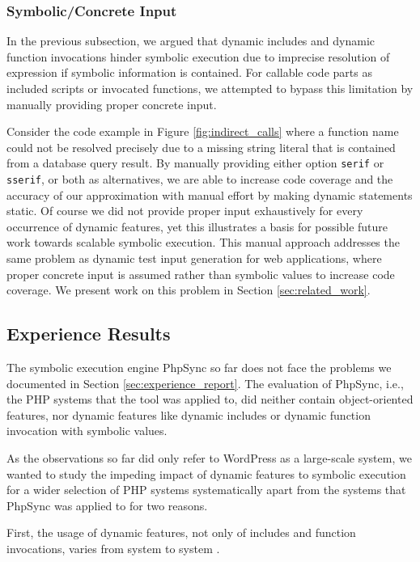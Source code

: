 \documentclass[sigconf]{acmart}
\renewcommand{\sf}[1]{\textsf{#1}}
\renewcommand{\tt}[1]{\texttt{#1}}
\begin{document}
\subsubsection{Symbolic/Concrete Input}
In the previous subsection, we argued that dynamic includes and dynamic
function invocations hinder symbolic execution  due to imprecise resolution of
expression if symbolic information is contained. For callable code parts as
included scripts or invocated functions, we attempted to bypass this limitation
by manually providing proper concrete input.

Consider the code example in Figure \ref{fig:indirect_calls} where a function
name could not be resolved precisely due to a missing string literal that is contained from a
database query result. By manually providing either option \tt{serif} or
\tt{sserif}, or both as alternatives, we are able to increase code coverage and
the accuracy of our approximation with manual effort by making dynamic
statements static. Of course we did not provide proper input exhaustively for
every occurrence of dynamic features, yet this illustrates a basis for possible
future work towards scalable symbolic execution. This manual approach addresses
the same problem as dynamic test input generation for web applications, where
proper concrete input is assumed rather than symbolic values to increase code
coverage. We present work on this problem in Section \ref{sec:related_work}.


\subsection{Experience Results} \label{sec:experience_results}
The symbolic execution engine \sf{PhpSync} \cite{Nguyen:2014:BCG:2635868.2635928} so far does not face the
problems we documented in Section \ref{sec:experience_report}. The evaluation of
PhpSync, i.e., the PHP systems that the tool was applied to, did neither contain object-oriented
features, nor dynamic features like dynamic includes or dynamic function
invocation with symbolic values.
 
As the observations so far did only refer to \sf{WordPress} as a large-scale
system, we wanted to study the impeding impact of dynamic features to symbolic
execution for a wider selection of PHP systems systematically apart from the
systems that \sf{PhpSync} was applied to for two reasons. 

First, the usage of dynamic features, not only of includes and function invocations, varies from
system to system \cite{hills2015variable}. 
\end{document}

